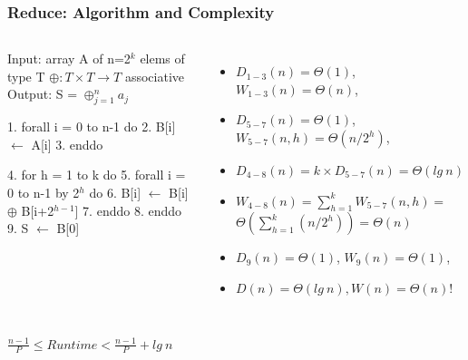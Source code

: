 \documentclass{beamer}
\renewcommand{\emph}[1]{\textcolor{structure}{#1}}
\newcommand{\emp}[1]{\textcolor{DikuRed}{ #1}}
\newcommand{\mymath}[1]{$ #1 $}
\newcommand{\myindx}[1]{_{#1}}
\newcommand{\myindu}[1]{^{#1}}
\begin{document}
\begin{frame}[fragile,t]
  \frametitle{Reduce: Algorithm and Complexity}


\begin{columns}
\begin{colorcode}[fontsize=\scriptsize]
Input:  array A of n=2\mymath{\myindu{k}} elems of type T
        \mymath{\oplus : T\times T\rightarrow T} associative
Output: S = \mymath{\oplus\myindx{j=1}\myindu{n} a\myindx{j}}

1.  \emph{forall i = 0 to n-1 do}
2.    B[i] \mymath{\leftarrow} A[i]
3.  \emph{enddo}

4.  \emp{for h = 1 to k do}
5.    \emph{forall i = 0 to n-1 by 2\mymath{\myindu{h}} do} 
6.      B[i] \mymath{\leftarrow} B[i] \mymath{\oplus} B[i+2\mymath{\myindu{h-1}}]
7.    \emph{enddo}
8.  \emp{enddo}
9.  S \mymath{\leftarrow} B[0]  
\end{colorcode}
\begin{itemize}
    \item $D_{1-3}(n) = \Theta(1)$, $W_{1-3}(n) = \Theta(n)$,
    \item $D_{5-7}(n) = \Theta(1)$, $W_{5-7}(n,h) = \Theta(n/2^h)$,
    \item $D_{4-8}(n) = k \times D_{5-7}(n) = \Theta(lg \ n)$
    \item $W_{4-8}(n) = \sum_{h=1}^k W_{5-7}(n,h) = $\\
          $\Theta(\sum_{h=1}^k (n/2^h) ) = \Theta(n)$
    \item $D_{9}(n) = \Theta(1)$, $W_{9}(n) = \Theta(1)$,\bigskip
    \item \emp{$D(n) = \Theta(lg \ n), W(n) = \Theta(n)$!}
\end{itemize}
\end{columns}
\bigskip


\begin{center}  
\emp{$\frac{n-1}{P} \leq  Runtime < \frac{n-1}{P} + lg \ n$}
\end{center}


\end{frame}
\end{document}
